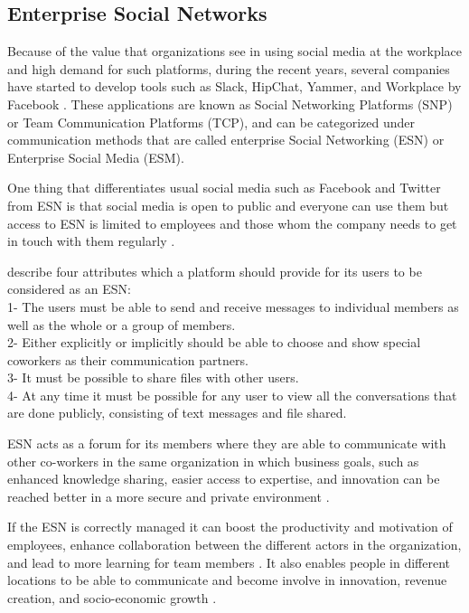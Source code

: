 \subsection{Enterprise Social Networks}
Because of the value that organizations see in using social media at the workplace and high demand for such platforms, during the recent years, several companies have started to develop tools such as Slack, HipChat, Yammer, and Workplace by Facebook \citep{Leroy2013}. These applications are known as Social Networking Platforms (SNP) or Team Communication Platforms (TCP), and can be categorized under communication methods that are called enterprise Social Networking (ESN) or Enterprise Social Media (ESM).

One thing that differentiates usual social media such as Facebook and Twitter from ESN is that social media is open to public and everyone can use them but access to ESN is limited to employees and those whom the company needs to get in touch with them regularly \citep{Turban2011}.

\citet{Leonardi2013} describe four attributes which a platform should provide for its users to be considered as an ESN:\\
1- The users must be able to send and receive messages to individual members as well as the whole or a group of members. \\
2- Either explicitly or implicitly should be able to choose and show special coworkers as their communication partners.\\
3- It must be possible to share files with other users.\\
4- At any time it must be possible for any user to view all the conversations that are done publicly, consisting of text messages and file shared.

ESN acts as a forum for its members where they are able to communicate with other co-workers in the same organization \citep{Leonardi2014} in which business goals, such as enhanced knowledge sharing, easier access to expertise, and innovation can be reached better in a more secure and private environment \citep{Leonardi2013}.

If the ESN is correctly managed it can boost the productivity and motivation of employees, enhance collaboration between the different actors in the organization, and lead to more learning for team members \citep{Leon2017}. It also enables people in different locations to be able to communicate and become involve in innovation, revenue creation, and socio-economic growth \citep{Qi2016}.

